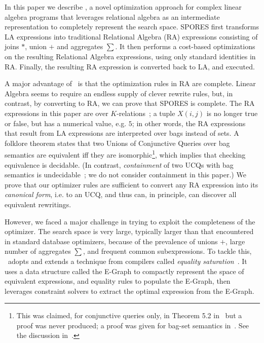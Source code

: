 In this paper we describe \sys, a novel optimization approach for
complex linear algebra programs that leverages relational algebra as
an intermediate representation to completely represent the search
space. SPORES first transforms LA expressions into traditional
Relational Algebra (RA) expressions consisting of joins $*$, union $+$
and aggregates $\sum$.  It then performs a cost-based optimizations on
the resulting Relational Algebra expressions, using only standard
identities in RA.  Finally, the resulting RA expression is converted
back to LA, and executed.

A major advantage of \sys\ is that the optimization rules in RA are
complete.  Linear Algebra seems to require an endless supply of clever
rewrite rules, but, in contrast, by converting to RA, we can prove
that SPORES is complete.  The RA expressions in this paper are
over $K$-relations~\cite{DBLP:conf/pods/GreenKT07}; a tuple $X(i,j)$
is no longer true or false, but has a numerical value, e.g. $5$; in
other words, the RA expressions that result from LA expressions are
interpreted over bags instead of sets.  A folklore theorem states that
two Unions of Conjunctive Queries over bag semantics are equivalent
iff they are isomorphic\footnote{This was claimed, for conjunctive
  queries only, in Theorem 5.2 in~\cite{DBLP:conf/pods/ChaudhuriV93}
  but a proof was never produced; a proof was given for bag-set
  semantics in~\cite{DBLP:journals/tocl/CohenSN05}.  See the
  discussion in~\cite{DBLP:conf/icdt/Green09}.}, which implies that
checking equivalence is decidable.  (In contrast, {\em containment} of
two UCQs with bag semantics is
undecidable~\cite{DBLP:journals/tods/IoannidisR95}; we do not consider
containment in this paper.)  We prove that our optimizer rules are
sufficient to convert any RA expression into its {\em canonical form},
i.e.  to an UCQ, and thus can, in principle, can discover all
equivalent rewritings.

However, we faced a major challenge in trying to exploit the
completeness of the optimizer.  The search space is very large,
typically larger than that encountered in standard database
optimizers, because of the prevalence of unions $+$, large number of
aggregates $\sum$, and frequent common subexpressions. To tackle this,
\sys\ adopts and extends a technique from compilers called {\em
  equality saturation}~\cite{DBLP:journals/corr/abs-1012-1802}.
It uses a data structure called the E-Graph \cite{10.5555/909447} to
compactly represent the space of equivalent expressions, and equality
rules to populate the E-Graph, then leverages constraint solvers to
extract the optimal expression from the E-Graph.  

